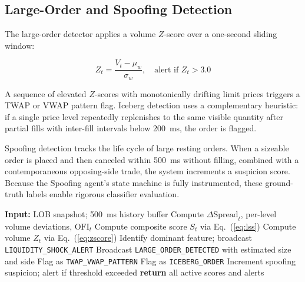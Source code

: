 \documentclass[conference]{IEEEtran}
\begin{document}
\subsection{Large-Order and Spoofing Detection}

The large-order detector applies a volume $Z$-score over a
one-second sliding window:

\begin{equation}
Z_t = \frac{V_t - \mu_w}{\sigma_w}, \quad \text{alert if } Z_t > 3.0
\label{eq:zscore}
\end{equation}

\noindent A sequence of elevated $Z$-scores with monotonically
drifting limit prices triggers a TWAP or VWAP pattern flag. Iceberg
detection uses a complementary heuristic: if a single price level
repeatedly replenishes to the same visible quantity after partial
fills with inter-fill intervals below 200~ms, the order is flagged.

Spoofing detection tracks the life cycle of large resting orders.
When a sizeable order is placed and then canceled within 500~ms
without filling, combined with a contemporaneous opposing-side trade,
the system increments a suspicion score. Because the Spoofing agent's
state machine is fully instrumented, these ground-truth labels
enable rigorous classifier evaluation.

\begin{algorithm}
\caption{Integrated Real-Time Detection Pipeline}
\begin{algorithmic}[1]
\STATE \textbf{Input:} LOB snapshot; 500~ms history buffer
\STATE Compute $\Delta\text{Spread}_t$, per-level volume deviations,
       $\text{OFI}_t$
\STATE Compute composite score $S_t$ via Eq.~(\ref{eq:lss})
\STATE Compute volume $Z_t$ via Eq.~(\ref{eq:zscore})
    \STATE Identify dominant feature; broadcast
           \texttt{LIQUIDITY\_SHOCK\_ALERT}
\ENDIF
{}
    \STATE Broadcast \texttt{LARGE\_ORDER\_DETECTED} with estimated
           size and side
\ENDIF
{}
    \STATE Flag as \texttt{TWAP\_VWAP\_PATTERN}
\ENDIF
{}
    \STATE Flag as \texttt{ICEBERG\_ORDER}
\ENDIF
{}
    \STATE Increment spoofing suspicion; alert if threshold exceeded
\ENDIF
\STATE \textbf{return} all active scores and alerts
\end{algorithmic}
\end{algorithm}
\end{document}
